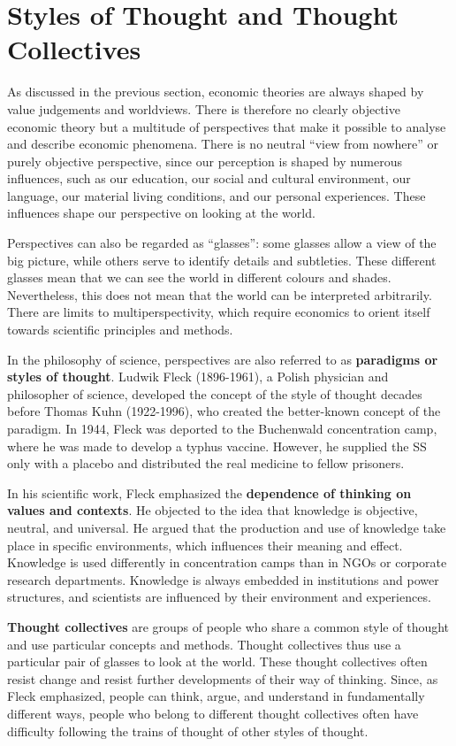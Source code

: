 \documentclass[
  british,
  a4paper,
  DIV=11,
  numbers=noendperiod,
  oneside,
  openany]{scrreprt}
\begin{document}
\section{Styles of Thought and Thought
Collectives}\label{styles-of-thought-and-thought-collectives}

As discussed in the previous section, economic theories are always
shaped by value judgements and worldviews. There is therefore no clearly
objective economic theory but a multitude of perspectives that make it
possible to analyse and describe economic phenomena. There is no neutral
``view from nowhere'' or purely objective perspective, since our
perception is shaped by numerous influences, such as our education, our
social and cultural environment, our language, our material living
conditions, and our personal experiences. These influences shape our
perspective on looking at the world.

Perspectives can also be regarded as ``glasses'': some glasses allow a
view of the big picture, while others serve to identify details and
subtleties. These different glasses mean that we can see the world in
different colours and shades. Nevertheless, this does not mean that the
world can be interpreted arbitrarily. There are limits to
multiperspectivity, which require economics to orient itself towards
scientific principles and methods.

In the philosophy of science, perspectives are also referred to as
\textbf{paradigms or styles of thought}. Ludwik Fleck (1896-1961), a
Polish physician and philosopher of science, developed the concept of
the style of thought decades before Thomas Kuhn (1922-1996), who created
the better-known concept of the paradigm. In 1944, Fleck was deported to
the Buchenwald concentration camp, where he was made to develop a typhus
vaccine. However, he supplied the SS only with a placebo and distributed
the real medicine to fellow prisoners.

In his scientific work, Fleck emphasized the \textbf{dependence of
thinking on values and contexts}. He objected to the idea that knowledge
is objective, neutral, and universal. He argued that the production and
use of knowledge take place in specific environments, which influences
their meaning and effect. Knowledge is used differently in concentration
camps than in NGOs or corporate research departments. Knowledge is
always embedded in institutions and power structures, and scientists are
influenced by their environment and experiences.

\textbf{Thought collectives} are groups of people who share a common
style of thought and use particular concepts and methods. Thought
collectives thus use a particular pair of glasses to look at the world.
These thought collectives often resist change and resist further
developments of their way of thinking. Since, as Fleck emphasized,
people can think, argue, and understand in fundamentally different ways,
people who belong to different thought collectives often have difficulty
following the trains of thought of other styles of thought.
\end{document}

